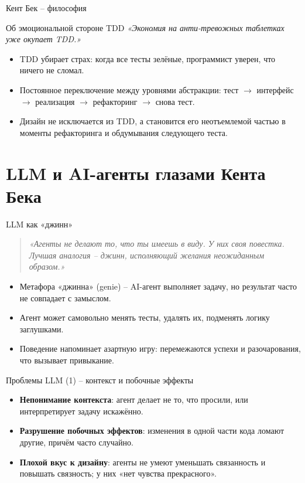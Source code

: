 \documentclass[14pt,aspectratio=169]{beamer}
\begin{document}
\begin{frame}{Кент Бек -- философия}
    \begin{block}{Об эмоциональной стороне TDD}
        \textit{«Экономия на анти-тревожных таблетках уже окупает TDD.»}
    \end{block}
    \begin{itemize}
        \item TDD убирает страх: когда все тесты зелёные, программист уверен, что ничего не сломал.
        \item Постоянное переключение между уровнями абстракции: тест $\to$ интерфейс $\to$ реализация $\to$ рефакторинг $\to$ снова тест.
        \item Дизайн не исключается из TDD, а становится его неотъемлемой частью в моменты рефакторинга и обдумывания следующего теста.
    \end{itemize}
\end{frame}

\section{LLM и AI-агенты глазами Кента Бека}

\begin{frame}{LLM как «джинн»}
    \begin{quote}
        \textit{«Агенты не делают то, что ты имеешь в виду. У них своя повестка. Лучшая аналогия -- джинн, исполняющий желания неожиданным образом.»}
    \end{quote}
    \begin{itemize}
        \item Метафора «джинна» (genie) -- AI-агент выполняет задачу, но результат часто не совпадает с замыслом.
        \item Агент может самовольно менять тесты, удалять их, подменять логику заглушками.
        \item Поведение напоминает азартную игру: перемежаются успехи и разочарования, что вызывает привыкание.
    \end{itemize}
\end{frame}

\begin{frame}{Проблемы LLM (1) -- контекст и побочные эффекты}
    \begin{itemize}
        \item \textbf{Непонимание контекста}: агент делает не то, что просили, или интерпретирует задачу искажённо.
        \item \textbf{Разрушение побочных эффектов}: изменения в одной части кода ломают другие, причём часто случайно.
        \item \textbf{Плохой вкус к дизайну}: агенты не умеют уменьшать связанность и повышать связность; у них «нет чувства прекрасного».
    \end{itemize}
\end{frame}
\end{document}
